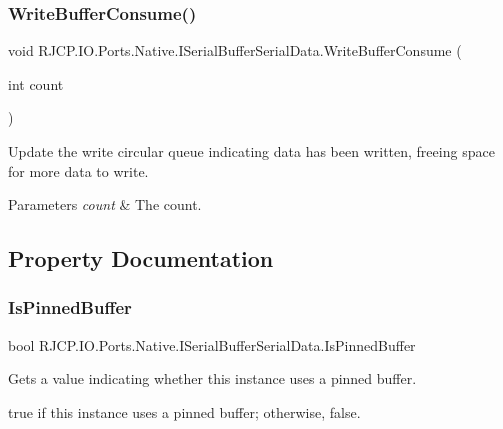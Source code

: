 \subsubsection{\texorpdfstring{WriteBufferConsume()}{WriteBufferConsume()}}
{\footnotesize\ttfamily void R\+J\+C\+P.\+I\+O.\+Ports.\+Native.\+I\+Serial\+Buffer\+Serial\+Data.\+Write\+Buffer\+Consume (\begin{DoxyParamCaption}\item[{int}]{count }\end{DoxyParamCaption})}



Update the write circular queue indicating data has been written, freeing space for more data to write. 


\begin{DoxyParams}{Parameters}
{\em count} & The count.\\
\hline
\end{DoxyParams}


\subsection{Property Documentation}
\mbox{\label{interface_r_j_c_p_1_1_i_o_1_1_ports_1_1_native_1_1_i_serial_buffer_serial_data_ad7ace29666319cac49b20929d6d8dfac}} 
\subsubsection{\texorpdfstring{IsPinnedBuffer}{IsPinnedBuffer}}
{\footnotesize\ttfamily bool R\+J\+C\+P.\+I\+O.\+Ports.\+Native.\+I\+Serial\+Buffer\+Serial\+Data.\+Is\+Pinned\+Buffer\hspace{0.3cm}{\ttfamily [get]}}



Gets a value indicating whether this instance uses a pinned buffer. 

{\ttfamily true} if this instance uses a pinned buffer; otherwise, {\ttfamily false}. \mbox{\label{interface_r_j_c_p_1_1_i_o_1_1_ports_1_1_native_1_1_i_serial_buffer_serial_data_ab0445ecad610149042e817879914d5f4}} 
